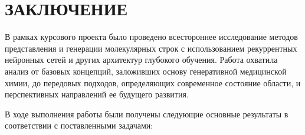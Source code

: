 \documentclass[../main.tex]{subfiles}
\begin{document}
\onlyinsubfile{
    \renewcommand{\contentsname}{ОГЛАВЛЕНИЕ}
    \setcounter{tocdepth}{3}
    \tableofcontents
}


\chapter*{\MakeUppercase{Заключение}}


В рамках курсового проекта было проведено всестороннее исследование методов представления и генерации молекулярных строк с использованием рекуррентных нейронных сетей и других архитектур глубокого обучения. Работа охватила анализ от базовых концепций, заложивших основу генеративной медицинской химии, до передовых подходов, определяющих современное состояние области, и перспективных направлений ее будущего развития.

В ходе выполнения работы были получены следующие основные результаты в соответствии с поставленными задачами:
\end{document}
